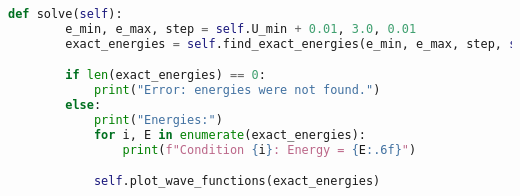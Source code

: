 \begin{lstlisting}[language=Python, caption=Код файла solver.py,label={lst:solver}]
    def solve(self):
        e_min, e_max, step = self.U_min + 0.01, 3.0, 0.01
        exact_energies = self.find_exact_energies(e_min, e_max, step, self.tol)

        if len(exact_energies) == 0:
            print("Error: energies were not found.")
        else:
            print("Energies:")
            for i, E in enumerate(exact_energies):
                print(f"Condition {i}: Energy = {E:.6f}")

            self.plot_wave_functions(exact_energies)
\end{lstlisting}